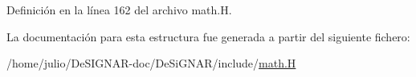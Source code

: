 Definición en la línea 162 del archivo math.\+H.



La documentación para esta estructura fue generada a partir del siguiente fichero\+:\begin{DoxyCompactItemize}
\item 
/home/julio/\+De\+S\+I\+G\+N\+A\+R-\/doc/\+De\+Si\+G\+N\+A\+R/include/\hyperlink{math_8_h}{math.\+H}\end{DoxyCompactItemize}
